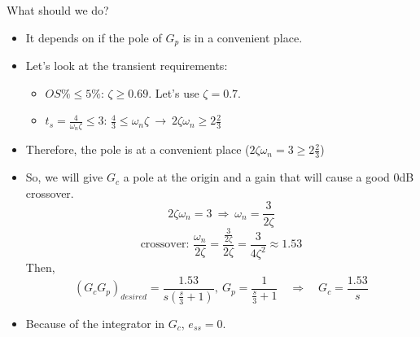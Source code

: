 \documentclass{book}
\begin{document}
What should we do?
\begin{itemize}
	\item It depends on if the pole of $ G_p $ is in a convenient place.
	\item Let's look at the transient requirements:
	\begin{itemize}
		\item $ OS\% \leq 5\% $: $ \zeta \geq 0.69 $. Let's use $ \zeta=0.7 $.
		\item $ t_s = \frac{4}{\omega_n\zeta} \leq 3 $: $ \frac{4}{3} \leq \omega_n\zeta \ \rightarrow\ 2\zeta\omega_n \geq 2 \frac{2}{3} $
	\end{itemize}
	\item Therefore, the pole is at a convenient place ($ 2\zeta\omega_n = 3 \geq 2 \frac{2}{3} $)
	\item So, we will give $ G_c $ a pole at the origin and a gain that will cause a good 0dB crossover.
	\[ 2\zeta\omega_n = 3 \ \Rightarrow\ \omega_n = \frac{3}{2\zeta} \]
	\[ \text{crossover: } \frac{\omega_n}{2\zeta} = \frac{\frac{3}{2\zeta}}{2\zeta} = \frac{3}{4\zeta^2} \approx 1.53  \]
	Then,
	\[ (G_cG_p)_{desired} = \frac{1.53}{s(\frac{s}{3}+1)},\ G_p = \frac{1}{\frac{s}{3}+1} \quad\Rightarrow\quad G_c = \frac{1.53}{s}  \]
	\item Because of the integrator in $ G_c $, $ e_{ss}=0 $.
\end{itemize}
\end{document}
